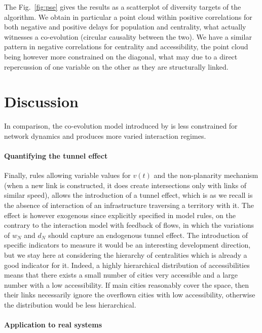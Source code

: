 The Fig.~\ref{fig:pse} gives the results as a scatterplot of diversity targets of the algorithm. We obtain in particular a point cloud within positive correlations for both negative and positive delays for population and centrality, what actually witnesses a co-evolution (circular causality between the two). We have a similar pattern in negative correlations for centrality and accessibility, the point cloud being however more constrained on the diagonal, what may due to a direct repercussion of one variable on the other as they are structurally linked.






\section{Discussion}



In comparison, the co-evolution model introduced by \cite{2018arXiv180409430R} is less constrained for network dynamics and produces more varied interaction regimes.


\paragraph{Quantifying the tunnel effect}

Finally, rules allowing variable values for $v(t)$ and the non-planarity mechanism (when a new link is constructed, it does create intersections only with links of similar speed), allows the introduction of a tunnel effect, which is as we recall is the absence of interaction of an infrastructure traversing a territory with it. The effect is however exogenous since explicitly specified in model rules, on the contrary to the interaction model with feedback of flows, in which the variations of $w_N$ and $d_N$ should capture an endogenous tunnel effect. The introduction of specific indicators to measure it would be an interesting development direction, but we stay here at considering the hierarchy of centralities which is already a good indicator for it. Indeed, a highly hierarchical distribution of accessibilities means that there exists a small number of cities very accessible and a large number with a low accessibility. If main cities reasonably cover the space, then their links necessarily ignore the overflown cities with low accessibility, otherwise the distribution would be less hierarchical.

\paragraph{Application to real systems}

